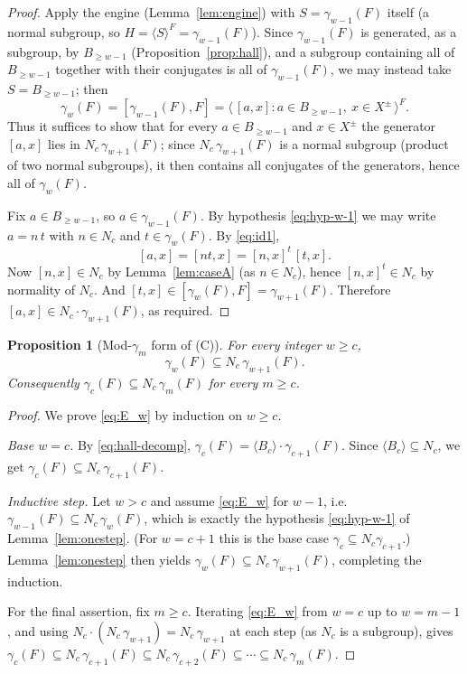 \documentclass{amsart}
\newtheorem{proposition}{Proposition}
\theoremstyle{definition}
\theoremstyle{remark}
\begin{document}
\begin{proof}
Apply the engine (Lemma~\ref{lem:engine}) with $S=\gamma_{w-1}(F)$ itself (a
normal subgroup, so $H=\langle S\rangle^F=\gamma_{w-1}(F)$). Since
$\gamma_{w-1}(F)$ is generated, as a subgroup, by $B_{\ge w-1}$
(Proposition~\ref{prop:hall}), and a subgroup containing all of $B_{\ge w-1}$
together with their conjugates is all of $\gamma_{w-1}(F)$, we may instead take
$S=B_{\ge w-1}$; then
\[
\gamma_w(F)=[\gamma_{w-1}(F),F]
=\big\langle\,[a,x] : a\in B_{\ge w-1},\ x\in X^{\pm}\,\big\rangle^{F}.
\]
Thus it suffices to show that for every $a\in B_{\ge w-1}$ and $x\in X^{\pm}$ the
generator $[a,x]$ lies in $N_c\,\gamma_{w+1}(F)$; since $N_c\,\gamma_{w+1}(F)$ is a
normal subgroup (product of two normal subgroups), it then contains all conjugates
of the generators, hence all of $\gamma_w(F)$.

Fix $a\in B_{\ge w-1}$, so $a\in\gamma_{w-1}(F)$. By hypothesis
\eqref{eq:hyp-w-1} we may write $a=n\,t$ with $n\in N_c$ and $t\in\gamma_w(F)$.
By \eqref{eq:id1},
\[
[a,x]=[nt,x]=[n,x]^{t}\,[t,x].
\]
Now $[n,x]\in N_c$ by Lemma~\ref{lem:caseA} (as $n\in N_c$), hence
$[n,x]^{t}\in N_c$ by normality of $N_c$. And $[t,x]\in[\gamma_w(F),F]
=\gamma_{w+1}(F)$. Therefore
$[a,x]\in N_c\cdot\gamma_{w+1}(F)$, as required.
\end{proof}

\begin{proposition}[Mod-$\gamma_m$ form of (C)]\label{prop:moddescent}
For every integer $w\ge c$,
\begin{equation}\label{eq:E_w}
\gamma_w(F)\subseteq N_c\,\gamma_{w+1}(F).
\end{equation}
Consequently $\gamma_c(F)\subseteq N_c\,\gamma_m(F)$ for every $m\ge c$.
\end{proposition}

\begin{proof}
We prove \eqref{eq:E_w} by induction on $w\ge c$.

\emph{Base $w=c$.} By \eqref{eq:hall-decomp},
$\gamma_c(F)=\langle B_c\rangle\cdot\gamma_{c+1}(F)$. Since
$\langle B_c\rangle\subseteq N_c$, we get
$\gamma_c(F)\subseteq N_c\,\gamma_{c+1}(F)$.

\emph{Inductive step.} Let $w>c$ and assume \eqref{eq:E_w} for $w-1$, i.e.\
$\gamma_{w-1}(F)\subseteq N_c\,\gamma_{w}(F)$, which is exactly the hypothesis
\eqref{eq:hyp-w-1} of Lemma~\ref{lem:onestep}. (For $w=c+1$ this is the base case
$\gamma_c\subseteq N_c\gamma_{c+1}$.) Lemma~\ref{lem:onestep} then yields
$\gamma_w(F)\subseteq N_c\,\gamma_{w+1}(F)$, completing the induction.

For the final assertion, fix $m\ge c$. Iterating \eqref{eq:E_w} from $w=c$ up to
$w=m-1$, and using $N_c\cdot(N_c\,\gamma_{w+1})=N_c\,\gamma_{w+1}$ at each step
(as $N_c$ is a subgroup), gives
$\gamma_c(F)\subseteq N_c\,\gamma_{c+1}(F)\subseteq N_c\,\gamma_{c+2}(F)\subseteq
\cdots\subseteq N_c\,\gamma_m(F)$.
\end{proof}
\end{document}
